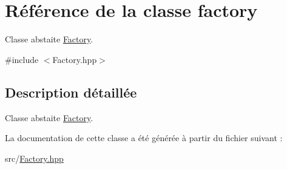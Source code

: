 \hypertarget{classfactory}{\section{Référence de la classe factory}
\label{classfactory}
}


Classe abstaite \hyperlink{class_factory}{Factory}.  




{\ttfamily \#include $<$Factory.\-hpp$>$}



\subsection{Description détaillée}
Classe abstaite \hyperlink{class_factory}{Factory}. 

La documentation de cette classe a été générée à partir du fichier suivant \-:\begin{DoxyCompactItemize}
\item 
src/\hyperlink{_factory_8hpp}{Factory.\-hpp}\end{DoxyCompactItemize}
